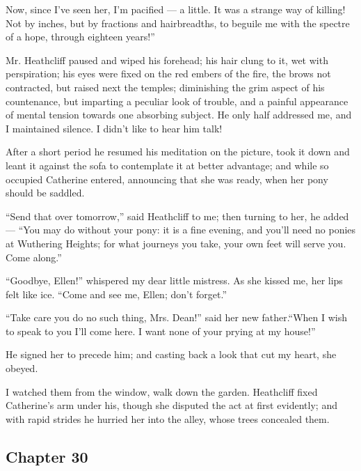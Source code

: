 \par Now, since I've seen her, I'm pacified — a little. It was a strange way of killing! Not by inches, but by fractions and hairbreadths, to beguile me with the spectre of a hope, through eighteen years!”
\par Mr. Heathcliff paused and wiped his forehead; his hair clung to it, wet with perspiration; his eyes were fixed on the red embers of the fire, the brows not contracted, but raised next the temples; diminishing the grim aspect of his countenance, but imparting a peculiar look of trouble, and a painful appearance of mental tension towards one absorbing subject. He only half addressed me, and I maintained silence. I didn't like to hear him talk!
\par After a short period he resumed his meditation on the picture, took it down and leant it against the sofa to contemplate it at better advantage; and while so occupied Catherine entered, announcing that she was ready, when her pony should be saddled.
\par “Send that over tomorrow,” said Heathcliff to me; then turning to her, he added — “You may do without your pony: it is a fine evening, and you'll need no ponies at Wuthering Heights; for what journeys you take, your own feet will serve you. Come along.”
\par “Goodbye, Ellen!” whispered my dear little mistress. As she kissed me, her lips felt like ice. “Come and see me, Ellen; don't forget.”
\par “Take care you do no such thing, Mrs. Dean!” said her new father.“When I wish to speak to you I'll come here. I want none of your prying at my house!”
\par He signed her to precede him; and casting back a look that cut my heart, she obeyed.
\par I watched them from the window, walk down the garden. Heathcliff fixed Catherine's arm under his, though she disputed the act at first evidently; and with rapid strides he hurried her into the alley, whose trees concealed them.

\subsection*{Chapter 30}

